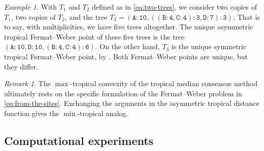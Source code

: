 \documentclass[a4paper,12pt]{amsart}
\theoremstyle{remark}
\newtheorem{example}[theorem]{Example}
\newtheorem{remark}[theorem]{Remark}
\begin{document}
\begin{example}
  With $T_1$ and $T_2$ defined as in \eqref{eq:two-trees}, we consider two copies of $T_1$, two copies of $T_2$, and the tree $T_3=\mathtt{(A:10,((B:4,C:4):3,D:7):3)}$.
  That is to say, with multiplicities, we have five trees altogether.
  The unique asymmetric tropical Fermat--Weber point of these five trees is the tree $\mathtt{(A:10,D:10,(B:4,C:4):6)}$.
  On the other hand, $T_3$ is the unique symmetric tropical Fermat--Weber point, by \cite[Lemma~8]{Lin-Yoshida:2018}.
  Both Fermat--Weber points are unique, but they differ.
\end{example}

\begin{remark}
  The $\max$-tropical convexity of the tropical median consensus method ultimately rests on the specific formulation of the Fermat--Weber problem in \eqref{eq:from-the-sites}.
  Exchanging the arguments in the asymmetric tropical distance function gives the $\min$-tropical analog.
\end{remark}

\subsection{Computational experiments}
\end{document}
